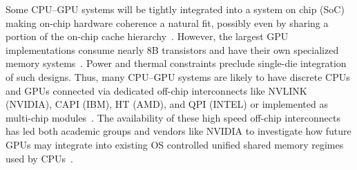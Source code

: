 Some CPU--GPU systems will be tightly integrated into a system on chip (SoC) making on-chip 
hardware coherence a natural fit, possibly even by sharing a portion of the on-chip 
cache hierarchy~\cite{HSA,AMDAPU,Hechtman2014}.  However, the largest GPU 
implementations consume nearly 8B transistors and have their own 
specialized memory systems~\cite{NVIDIA8BILLION}.  
Power and thermal constraints preclude single-die integration of such designs. 
Thus, many CPU--GPU systems are likely to have 
discrete CPUs and GPUs connected via dedicated off-chip interconnects like 
NVLINK (NVIDIA), CAPI (IBM), HT (AMD), and QPI (INTEL) or implemented as 
multi-chip modules~\cite{NVLINK,CAPI,AMDHT,INTELQPI,Chen92}. The availability of these
high speed off-chip interconnects has led both academic groups and vendors like NVIDIA
to investigate how future GPUs may integrate into existing OS controlled 
unified shared memory regimes used by CPUs~\cite{Pichai2014,Power2014,Agarwal2015,Agarwal2015b}.

